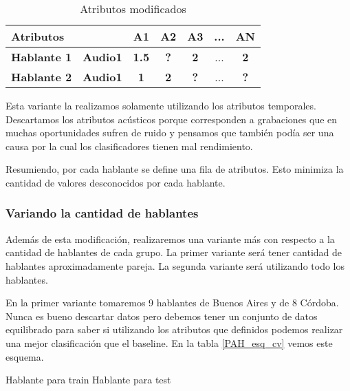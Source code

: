 \begin{table}[H]
	\centering
	\begin{tabular}{|l|l|ccccc|}
		\hline
		\multicolumn{2}{|l|}{Atributos} & A1 & A2 & A3 & ... & AN \\
		\hline 
		\textbf{Hablante 1} & \textbf{Audio1} & \textbf{1.5} & \textbf{?} & \textbf{2} & ... & \textbf{2}\\
		\hline
		\textbf{Hablante 2} & \textbf{Audio1} & \textbf{1} & \textbf{2} & \textbf{?} & ... & \textbf{?} \\
		\hline
	\end{tabular}
	\caption{Atributos modificados}
	\label{PAH_datos_comb}
\end{table}

Esta variante la realizamos solamente utilizando los atributos temporales. Descartamos los atributos acústicos porque corresponden a grabaciones que en muchas oportunidades sufren de ruido y pensamos que también podía ser una causa por la cual los clasificadores tienen mal rendimiento.

Resumiendo, por cada hablante se define una fila de atributos. Esto minimiza la cantidad de valores desconocidos por cada hablante.

\subsubsection*{Variando la cantidad de hablantes}

Además de esta modificación, realizaremos una variante más con respecto a la cantidad de hablantes de cada grupo. La primer variante será tener cantidad de hablantes aproximadamente pareja. La segunda variante será utilizando todo los hablantes.  

En la primer variante tomaremos 9 hablantes de Buenos Aires y de 8 Córdoba. Nunca es bueno descartar datos pero debemos tener un conjunto de datos equilibrado para saber si utilizando los atributos que definidos podemos realizar una mejor clasificación que el baseline. En la tabla \ref{PAH_esq_cv} vemos este esquema.

\begin{center}
	\mycirc[blue] Hablante para train \mycirc[red] Hablante para test
\end{center}

